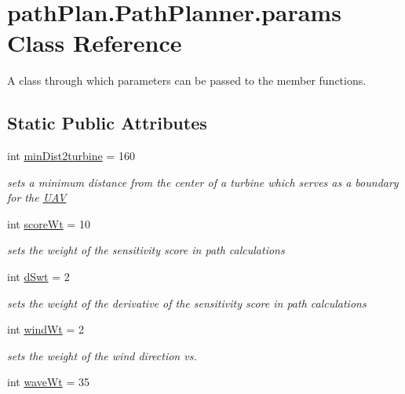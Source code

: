 \hypertarget{classpath_plan_1_1_path_planner_1_1params}{}\section{path\+Plan.\+Path\+Planner.\+params Class Reference}
\label{classpath_plan_1_1_path_planner_1_1params}


A class through which parameters can be passed to the member functions.  


\subsection*{Static Public Attributes}
\begin{DoxyCompactItemize}
\item 
int \mbox{\hyperlink{classpath_plan_1_1_path_planner_1_1params_a839dcb73ab2c3b44e4b2f66d9134bfe7}{min\+Dist2turbine}} = 160
\begin{DoxyCompactList}\small\item\em sets a minimum distance from the center of a turbine which serves as a boundary for the \mbox{\hyperlink{classpath_plan_1_1_u_a_v}{U\+AV}} \end{DoxyCompactList}\item 
int \mbox{\hyperlink{classpath_plan_1_1_path_planner_1_1params_aae56a5ff040506a7653180736166bc91}{score\+Wt}} = 10
\begin{DoxyCompactList}\small\item\em sets the weight of the sensitivity score in path calculations \end{DoxyCompactList}\item 
int \mbox{\hyperlink{classpath_plan_1_1_path_planner_1_1params_a610fb5e919a89498e435fded5291dc1a}{d\+Swt}} = 2
\begin{DoxyCompactList}\small\item\em sets the weight of the derivative of the sensitivity score in path calculations \end{DoxyCompactList}\item 
int \mbox{\hyperlink{classpath_plan_1_1_path_planner_1_1params_a0aafe9db7a80b4f22c7e2ad577b8daff}{wind\+Wt}} = 2
\begin{DoxyCompactList}\small\item\em sets the weight of the wind direction vs. \end{DoxyCompactList}\item 
int \mbox{\hyperlink{classpath_plan_1_1_path_planner_1_1params_aa33ac57c3fbbe451c9e8a7a34b237eee}{wave\+Wt}} = 35

\end{DoxyCompactItemize}
